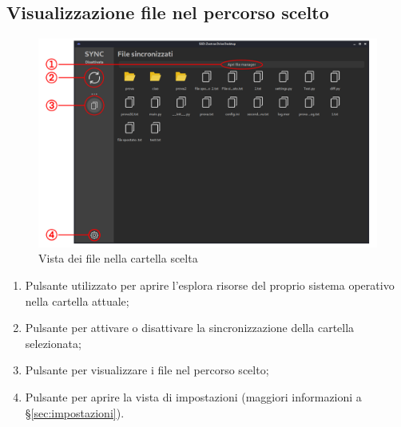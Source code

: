 \subsection{Visualizzazione file nel percorso scelto}
\begin{figure}[H]
    \centering
    \includegraphics[scale = 0.30]{components/img/file-view.png}
    \caption{Vista dei file nella cartella scelta}
    \label{fig:Vista dei file nel percorso scelto}
\end{figure}
\begin{enumerate}
	\item Pulsante utilizzato per aprire l'esplora risorse del proprio sistema operativo nella cartella attuale;
	\item Pulsante per attivare o disattivare la sincronizzazione della cartella selezionata;
	\item Pulsante per visualizzare i file nel percorso scelto;
	\item Pulsante per aprire la vista di impostazioni (maggiori informazioni a \S{}\ref{sec:impostazioni}).
\end{enumerate}

